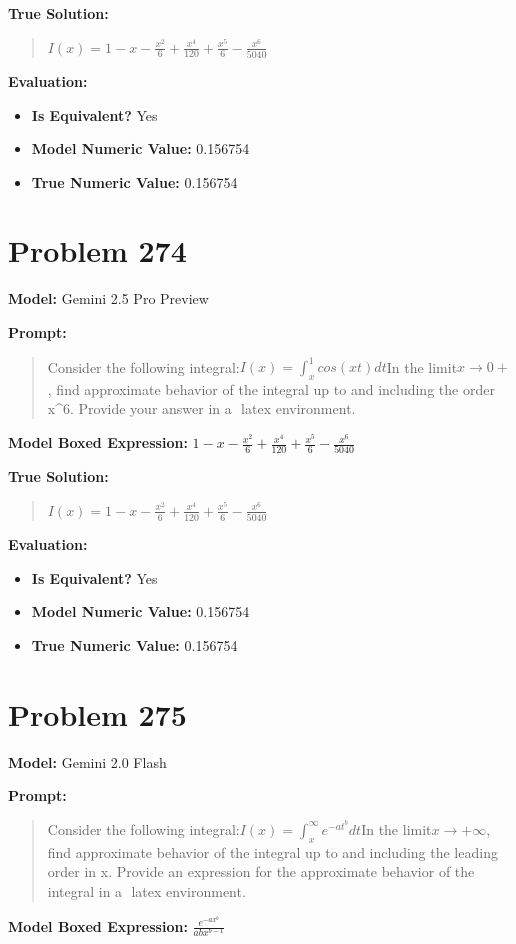 \documentclass{article}
\begin{document}
{\textbf{True Solution:}
\begin{quote}
$I(x) = 1 - x - \frac{x^2}{6} + \frac{x^4}{120} + \frac{x^5}{6} - \frac{x^6}{5040}$
\end{quote}

\textbf{Evaluation:}
\begin{itemize}
\item \textbf{Is Equivalent?} Yes
\item \textbf{Model Numeric Value:} 0.156754
\item \textbf{True Numeric Value:} 0.156754
\end{itemize}
\vspace{1cm}
\section*{Problem 274}
\textbf{Model:} Gemini 2.5 Pro Preview

\textbf{Prompt:}
\begin{quote}
Consider the following integral:$I(x)=\int_x^{1}cos(xt)dt$In the limit$x \to 0+$, find approximate behavior of the integral up to and including the order x^6. Provide your answer in a $\boxed{}$ latex environment.
\end{quote}
\textbf{Model Boxed Expression:} $1 - x - \frac{x^2}{6} + \frac{x^4}{120} + \frac{x^5}{6} - \frac{x^6}{5040}$

\textbf{True Solution:}
\begin{quote}
$I(x) = 1 - x - \frac{x^2}{6} + \frac{x^4}{120} + \frac{x^5}{6} - \frac{x^6}{5040}$
\end{quote}

\textbf{Evaluation:}
\begin{itemize}
\item \textbf{Is Equivalent?} Yes
\item \textbf{Model Numeric Value:} 0.156754
\item \textbf{True Numeric Value:} 0.156754
\end{itemize}
\vspace{1cm}
\section*{Problem 275}
\textbf{Model:} Gemini 2.0 Flash

\textbf{Prompt:}
\begin{quote}
Consider the following integral:$I(x) = \int_{x}^{\infty} e^{-at^b} dt$In the limit$x \to +\infty$, find approximate behavior of the integral up to and including the leading order in x. Provide an expression for the approximate behavior of the integral in a $\boxed{}$ latex environment.
\end{quote}
\textbf{Model Boxed Expression:} $\frac{e^{-ax^b}}{abx^{b-1}}$

}
\end{document}
